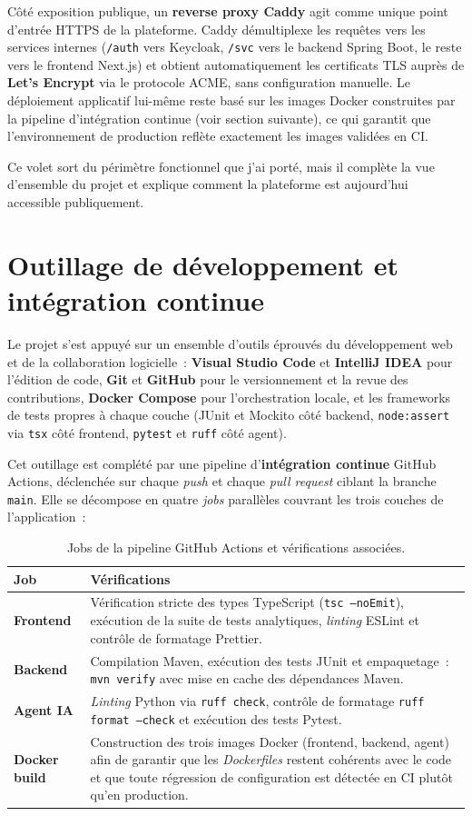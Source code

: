 \documentclass[12pt,a4paper]{report}
\begin{document}
Côté exposition publique, un \textbf{reverse proxy Caddy} agit comme unique point d'entrée HTTPS de la plateforme. Caddy démultiplexe les requêtes vers les services internes (\texttt{/auth} vers Keycloak, \texttt{/svc} vers le backend Spring Boot, le reste vers le frontend Next.js) et obtient automatiquement les certificats TLS auprès de \textbf{Let's Encrypt} via le protocole ACME, sans configuration manuelle. Le déploiement applicatif lui-même reste basé sur les images Docker construites par la pipeline d'intégration continue (voir section suivante), ce qui garantit que l'environnement de production reflète exactement les images validées en CI.

Ce volet sort du périmètre fonctionnel que j'ai porté, mais il complète la vue d'ensemble du projet et explique comment la plateforme est aujourd'hui accessible publiquement.

\section{Outillage de développement et intégration continue}
Le projet s'est appuyé sur un ensemble d'outils éprouvés du développement web et de la collaboration logicielle~: \textbf{Visual Studio Code} et \textbf{IntelliJ IDEA} pour l'édition de code, \textbf{Git} et \textbf{GitHub} pour le versionnement et la revue des contributions, \textbf{Docker Compose} pour l'orchestration locale, et les frameworks de tests propres à chaque couche (JUnit et Mockito côté backend, \texttt{node:assert} via \texttt{tsx} côté frontend, \texttt{pytest} et \texttt{ruff} côté agent).

Cet outillage est complété par une pipeline d'\textbf{intégration continue} GitHub Actions, déclenchée sur chaque \textit{push} et chaque \textit{pull request} ciblant la branche \texttt{main}. Elle se décompose en quatre \textit{jobs} parallèles couvrant les trois couches de l'application~:

\begin{table}[H]
\centering
\caption{Jobs de la pipeline GitHub Actions et vérifications associées.}
\begin{tabularx}{\textwidth}{>{\bfseries}L{3.6cm}Y}
\toprule
Job & Vérifications \\
\midrule
Frontend & Vérification stricte des types TypeScript (\texttt{tsc --noEmit}), exécution de la suite de tests analytiques, \textit{linting} ESLint et contrôle de formatage Prettier. \\
Backend & Compilation Maven, exécution des tests JUnit et empaquetage~: \texttt{mvn verify} avec mise en cache des dépendances Maven. \\
Agent IA & \textit{Linting} Python via \texttt{ruff check}, contrôle de formatage \texttt{ruff format --check} et exécution des tests Pytest. \\
Docker build & Construction des trois images Docker (frontend, backend, agent) afin de garantir que les \textit{Dockerfiles} restent cohérents avec le code et que toute régression de configuration est détectée en CI plutôt qu'en production. \\
\bottomrule
\end{tabularx}
\label{tab:ci-jobs}
\end{table}
\end{document}
